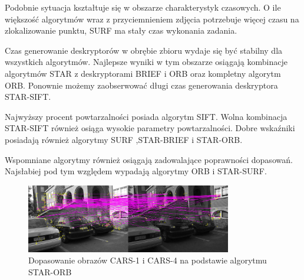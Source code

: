 Podobnie sytuacja kształtuje się w obszarze charakterystyk czasowych. O ile większość algorytmów wraz z przyciemnieniem zdjęcia potrzebuje więcej czasu na zlokalizowanie punktu, SURF ma stały czas wykonania zadania.

Czas generowanie deskryptorów w obrębie zbioru wydaje się być stabilny dla wszystkich algorytmów. Najlepsze wyniki w tym obszarze osiągają kombinacje algorytmów STAR z deskryptorami BRIEF i ORB oraz kompletny algorytm ORB. Ponownie możemy zaobserwować długi czas generowania deskryptora STAR-SIFT.

Najwyższy procent powtarzalności posiada algorytm SIFT. Wolna kombinacja STAR-SIFT również osiąga wysokie parametry powtarzalności. Dobre wskaźniki posiadają również algorytmy SURF ,STAR-BRIEF i STAR-ORB.

Wspomniane algorytmy również osiągają zadowalające poprawności dopasowań. Najsłabiej pod tym względem wypadają algorytmy ORB i STAR-SURF.

\begin{figure}
\centering
\includegraphics[width=0.8\textwidth]{pict/badania/cars_star_orb_1_4.png}
\caption{Dopasowanie obrazów CARS-1 i CARS-4 na podstawie algorytmu STAR-ORB}
\end{figure}



\FloatBarrier